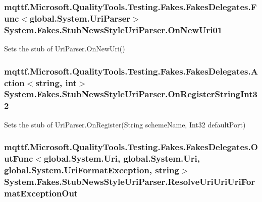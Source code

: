 \hypertarget{class_system_1_1_fakes_1_1_stub_news_style_uri_parser_a1c77eca77019a8c58d30c55a1b2755c1}{
\subsubsection[{On\-New\-Uri01}]{\setlength{\rightskip}{0pt plus 5cm}mqttf.\-Microsoft.\-Quality\-Tools.\-Testing.\-Fakes.\-Fakes\-Delegates.\-Func$<$global.\-System.\-Uri\-Parser$>$ System.\-Fakes.\-Stub\-News\-Style\-Uri\-Parser.\-On\-New\-Uri01}}\label{class_system_1_1_fakes_1_1_stub_news_style_uri_parser_a1c77eca77019a8c58d30c55a1b2755c1}


Sets the stub of Uri\-Parser.\-On\-New\-Uri()

\hypertarget{class_system_1_1_fakes_1_1_stub_news_style_uri_parser_aab598fbc356c210c9095ba0ccc77485e}{
\subsubsection[{On\-Register\-String\-Int32}]{\setlength{\rightskip}{0pt plus 5cm}mqttf.\-Microsoft.\-Quality\-Tools.\-Testing.\-Fakes.\-Fakes\-Delegates.\-Action$<$string, int$>$ System.\-Fakes.\-Stub\-News\-Style\-Uri\-Parser.\-On\-Register\-String\-Int32}}\label{class_system_1_1_fakes_1_1_stub_news_style_uri_parser_aab598fbc356c210c9095ba0ccc77485e}


Sets the stub of Uri\-Parser.\-On\-Register(\-String scheme\-Name, Int32 default\-Port)

\hypertarget{class_system_1_1_fakes_1_1_stub_news_style_uri_parser_ae569d058ccbed8ceec152b01adb2acf4}{
\subsubsection[{Resolve\-Uri\-Uri\-Uri\-Format\-Exception\-Out}]{\setlength{\rightskip}{0pt plus 5cm}mqttf.\-Microsoft.\-Quality\-Tools.\-Testing.\-Fakes.\-Fakes\-Delegates.\-Out\-Func$<$global.\-System.\-Uri, global.\-System.\-Uri, global.\-System.\-Uri\-Format\-Exception, string$>$ System.\-Fakes.\-Stub\-News\-Style\-Uri\-Parser.\-Resolve\-Uri\-Uri\-Uri\-Format\-Exception\-Out}}\label{class_system_1_1_fakes_1_1_stub_news_style_uri_parser_ae569d058ccbed8ceec152b01adb2acf4}


